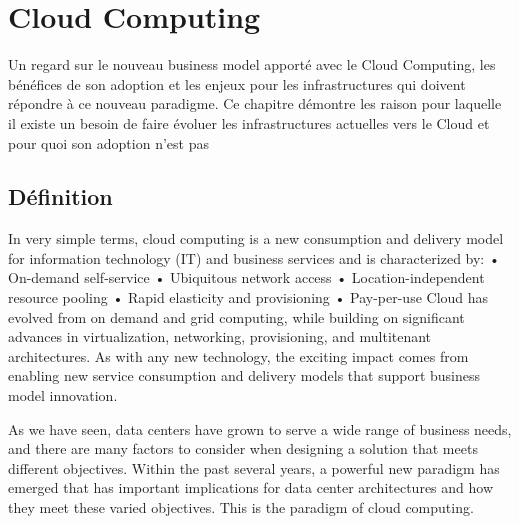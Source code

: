 
\chapter{Cloud Computing}

 Un regard sur le nouveau business model apporté avec le Cloud Computing, les bénéfices de son adoption et les enjeux pour les infrastructures qui doivent répondre à ce nouveau paradigme. Ce chapitre démontre les raison pour laquelle il existe un besoin de faire évoluer les infrastructures actuelles vers le Cloud et pour quoi son adoption n'est pas 

\section{Définition}
In very simple terms, cloud computing is a new consumption and delivery model for information technology (IT) and business services and is characterized by:
 • On-demand self-service
 • Ubiquitous network access
 • Location-independent resource pooling
 • Rapid elasticity and provisioning
 • Pay-per-use
Cloud has evolved from on demand and grid computing, while building on significant advances in virtualization, networking, provisioning, and multitenant architectures. As with any new technology, the exciting impact comes from enabling new service consumption and delivery models that support business model innovation.

As we have seen, data centers have grown to serve a wide range of business needs, and there are many factors to consider when designing a solution that meets different objectives. Within the past several years, a powerful new paradigm has emerged that has important implications for data center architectures and how they meet these varied objectives. This is the paradigm of cloud computing.

